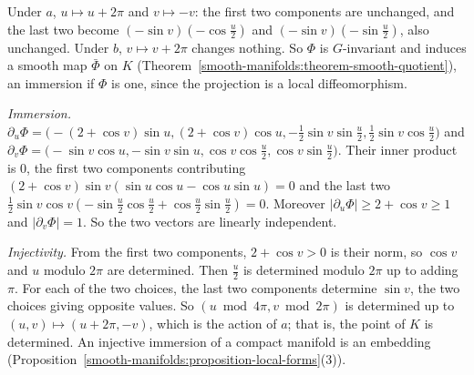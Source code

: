 \begin{solution}
Under $a$, $u \mapsto u + 2\pi$ and $v \mapsto -v$: the first two components are unchanged, and the last two become $(-\sin v)(-\cos\frac u2)$ and $(-\sin v)(-\sin\frac u2)$, also unchanged. Under $b$, $v \mapsto v + 2\pi$
changes nothing. So $\Phi$ is $G$-invariant and induces a smooth map $\bar\Phi$ on $K$ (Theorem~\ref{smooth-manifolds:theorem-smooth-quotient}), an immersion if $\Phi$ is one, since the projection is a local diffeomorphism.

\emph{Immersion.} $\partial_u\Phi = \bigl(-(2 + \cos v)\sin u, (2 + \cos v)\cos u, -\frac12\sin v\sin\frac u2, \frac12\sin v\cos\frac u2\bigr)$ and
$\partial_v\Phi = \bigl(-\sin v\cos u, -\sin v\sin u, \cos v\cos\frac u2, \cos v\sin\frac u2\bigr)$. Their inner product is $0$, the first two components contributing $(2 + \cos v)\sin v(\sin u\cos u - \cos u\sin u) = 0$ and
the last two $\frac12\sin v\cos v(-\sin\frac u2\cos\frac u2 + \cos\frac u2\sin\frac u2) = 0$. Moreover $|\partial_u\Phi| \geq 2 + \cos v \geq 1$ and $|\partial_v\Phi| = 1$. So the two vectors are linearly independent.

\emph{Injectivity.} From the first two components, $2 + \cos v > 0$ is their norm, so $\cos v$ and $u$ modulo $2\pi$ are determined. Then $\frac u2$ is determined modulo $2\pi$ up to adding $\pi$. For each of the two choices,
the last two components determine $\sin v$, the two choices giving opposite values. So $(u \bmod 4\pi, v \bmod 2\pi)$ is determined up to $(u, v) \mapsto (u + 2\pi, -v)$, which is the action of $a$; that is, the point of
$K$ is determined. An injective immersion of a compact manifold is an embedding (Proposition~\ref{smooth-manifolds:proposition-local-forms}(3)).
\end{solution}
